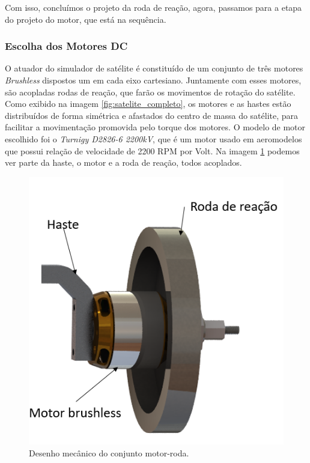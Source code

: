 Com isso, concluímos o projeto da roda de reação, agora, passamos para a etapa do projeto do motor, que está na sequência.



\subsubsection{Escolha dos Motores DC}

O atuador do simulador de satélite é constituído de um conjunto de três motores \textit{Brushless} dispostos um em cada eixo cartesiano. Juntamente com esses motores, são acopladas rodas de reação, que farão os movimentos de rotação do satélite. Como exibido na imagem \ref{fig:satelite_completo}, os motores e as hastes estão distribuídos de forma simétrica e afastados do centro de massa do satélite, para facilitar a movimentação promovida pelo torque dos motores. O modelo de motor escolhido foi o \textit{Turnigy D2826-6 2200kV}, que é um motor usado em aeromodelos que possui relação de velocidade de 2200 RPM por Volt. Na imagem \ref{fig:motor_roda_desenho} podemos ver parte da haste, o motor e a roda de reação, todos acoplados. 

\begin{figure}[H]
  \caption{Desenho mecânico do conjunto motor-roda.}
  \begin{center}
      \includegraphics[scale=.45]{metodologia/img/motor_roda_desenho}
  \end{center}
  \label{fig:motor_roda_desenho}
\end{figure}

